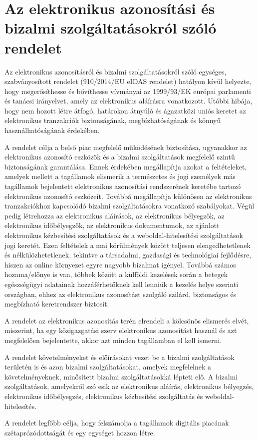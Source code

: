 \section{Az elektronikus azonosítási és bizalmi szolgáltatásokról szóló rendelet}

Az elektronikus azonosításról és bizalmi szolgáltatásokról szóló egységes, szabványosított rendelet (910/2014/EU eIDAS rendelet) hatályon kívül helyezte, hogy megerősíthesse és bővíthesse vívmányai az 1999/93/EK európai parlamenti és tanácsi irányelvet, amely az elektronikus aláírásra vonatkozott. Utóbbi hibája, hogy nem hozott létre átfogó, határokon átnyúló és ágazatközi uniós keretet az elektronikus tranzakciók biztonságának, megbízhatóságának és könnyű használhatóságának érdekében.

A rendelet célja a belső piac megfelelő működésének biztosítása, ugyanakkor az elektronikus azonosító eszközök és a bizalmi szolgáltatások megfelelő szintű biztonságának garantálása. Ennek érdekében 	
megállapítja azokat a feltételeket, amelyek mellett a tagállamok elismerik a természetes és jogi személyek más tagállamok bejelentett elektronikus azonosítási rendszerének keretébe tartozó elektronikus azonosító eszközeit. Továbbá megállapítja különösen az elektronikus tranzakciókhoz kapcsolódó bizalmi szolgáltatásokra vonatkozó szabályokat. Végül pedig létrehozza az elektronikus aláírások, az elektronikus bélyegzők, az elektronikus időbélyegzők, az elektronikus dokumentumok, az ajánlott elektronikus kézbesítési szolgáltatások és a weboldal-hitelesítési szolgáltatások jogi keretét. Ezen feltételek a mai körülmények között teljesen elengedhetetlenek és nélkülözhetetlenek, tekintve a társadalmi, gazdasági és technológiai fejlődésre, hiszen az online környezet egyre nagyobb bizalmat igényel. Továbbá számos hozama/előnye is van, többek között a külföldi kezelések során a betegek egészségügyi adatainak hozzáférhetőknek kell lenniük a kezelés helye szerinti országban, ehhez az elektronikus azonosítást szolgáló szilárd, biztonságos és megbízható keretrendszer biztosít.

A rendelet az elektronikus azonosítás terén elrendeli a kölcsönös elismerés elvét, miszerint, ha egy közigazgatási szerv elektronikus azonosítást használ és azt megfelelően bejelentette, akkor azt minden tagállamban el kell ismerni.

A rendelet követelményeket és előírásokat vezet be a bizalmi szolgáltatások területén is és azon bizalmi szolgáltatásokat, amelyek megfelelnek a követelményeknek, minősített bizalmi szolgáltatásokká lépteti elő. A bizalmi szolgáltatások, amelyekről szó esik az elektronikus aláírás, elektronikus bélyegzés, elektronikus időbélyegzés, elektronikus kézbesítési szolgáltatás és weboldal-hitelesítés.

A rendelet legfőbb célja, hogy felszámolja a tagállamok digitális piacának szétaprózódottságát és egy egységet hozzon létre. \cite{eIDAS}